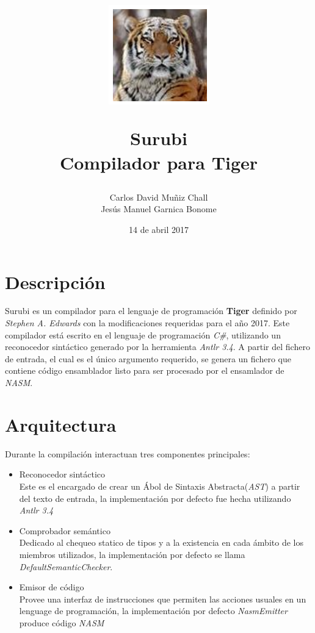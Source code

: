 \documentclass[a4paper,10pt]{article}
\title{
\begin{figure}[h]
\centering
\includegraphics[width=0.2\linewidth]{t}
\end{figure}
\textbf{Surubi}\\ Compilador para Tiger} %
\author{Carlos David Muñiz Chall\\Jesús Manuel Garnica Bonome}
\date{14 de abril 2017}
\begin{document}
	\maketitle

	\section{Descripción}
		
		Surubi es un compilador para el lenguaje de programación \textbf{Tiger} definido por \textit{Stephen A. Edwards}\cite{tlrm} con la modificaciones requeridas para el año 2017\cite{ol}. Este compilador está escrito en el lenguaje de programación \textit{C\#}, utilizando un reconocedor sintáctico generado por la herramienta \textit{Antlr 3.4}. A partir del fichero de entrada, el cual es el único argumento requerido, se genera un fichero que contiene código ensamblador listo para ser procesado por el ensamlador de \textit{NASM}.
		
	\section{Arquitectura}
		
		Durante la compilación interactuan tres componentes principales:
		\begin{itemize}
			\item Reconocedor sintáctico \\
				Este es el encargado de crear un Ábol de Sintaxis Abstracta(\textit{AST}) a partir del texto de entrada,
				la implementación por defecto fue hecha utilizando \textit{Antlr 3.4}
			\item Comprobador semántico \\
				Dedicado al chequeo statico de tipos y a la existencia en cada ámbito de los miembros utilizados,
				la implementación por defecto se llama \textit{DefaultSemanticChecker}.
			\item Emisor de código \\
				Provee una interfaz de instrucciones que permiten las acciones usuales en un lenguage de programación,
				la implementación por defecto \textit{NasmEmitter} produce código \textit{NASM}
		\end{itemize}
		
\end{document}
